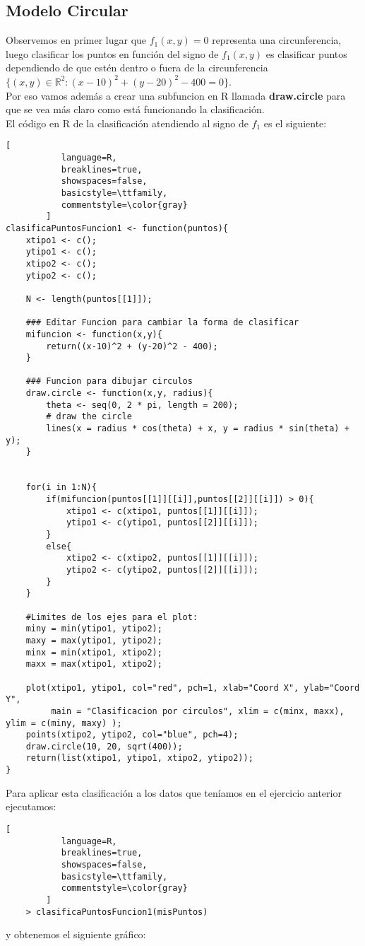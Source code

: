 \documentclass[11pt,fleqn]{book} %
\begin{document}
\subsection{Modelo Circular}
Observemos en primer lugar que $f_1(x,y)=0$ representa una circunferencia, luego clasificar los puntos en función del signo de  $f_1(x,y)$ es clasificar puntos dependiendo de que estén dentro o fuera de la circunferencia $\{(x,y) \in \mathbb{R}^2 : (x-10)^2 + (y-20)^2 - 400 = 0\}$.\\
Por eso vamos además a crear una subfuncion en R llamada \textbf{draw.circle} para que se vea más claro como está funcionando la clasificación.\\
El código en R de la clasificación atendiendo al signo de $f_1$ es el siguiente:
\begin{lstlisting}[
           language=R,
           breaklines=true,
           showspaces=false,
           basicstyle=\ttfamily,
           commentstyle=\color{gray}
        ]
clasificaPuntosFuncion1 <- function(puntos){
    xtipo1 <- c();
    ytipo1 <- c();
    xtipo2 <- c();
    ytipo2 <- c();
    
    N <- length(puntos[[1]]);
    
    ### Editar Funcion para cambiar la forma de clasificar
    mifuncion <- function(x,y){
        return((x-10)^2 + (y-20)^2 - 400);
    }
    
    ### Funcion para dibujar circulos 
    draw.circle <- function(x,y, radius){
        theta <- seq(0, 2 * pi, length = 200);
        # draw the circle
        lines(x = radius * cos(theta) + x, y = radius * sin(theta) + y);
    }
    
    
    for(i in 1:N){
        if(mifuncion(puntos[[1]][[i]],puntos[[2]][[i]]) > 0){
            xtipo1 <- c(xtipo1, puntos[[1]][[i]]);
            ytipo1 <- c(ytipo1, puntos[[2]][[i]]);
        }
        else{
            xtipo2 <- c(xtipo2, puntos[[1]][[i]]);
            ytipo2 <- c(ytipo2, puntos[[2]][[i]]);
        }
    }
    
    #Limites de los ejes para el plot:
    miny = min(ytipo1, ytipo2);
    maxy = max(ytipo1, ytipo2);
    minx = min(xtipo1, xtipo2);
    maxx = max(xtipo1, xtipo2);
    
    plot(xtipo1, ytipo1, col="red", pch=1, xlab="Coord X", ylab="Coord Y", 
         main = "Clasificacion por circulos", xlim = c(minx, maxx), ylim = c(miny, maxy) );
    points(xtipo2, ytipo2, col="blue", pch=4);
    draw.circle(10, 20, sqrt(400));
    return(list(xtipo1, ytipo1, xtipo2, ytipo2));
}
\end{lstlisting}
Para aplicar esta clasificación a los datos que teníamos en el ejercicio anterior ejecutamos:\\ 
\begin{lstlisting}[
           language=R,
           breaklines=true,
           showspaces=false,
           basicstyle=\ttfamily,
           commentstyle=\color{gray}
        ]
	> clasificaPuntosFuncion1(misPuntos)
\end{lstlisting}
y obtenemos el siguiente gráfico:
\end{document}
